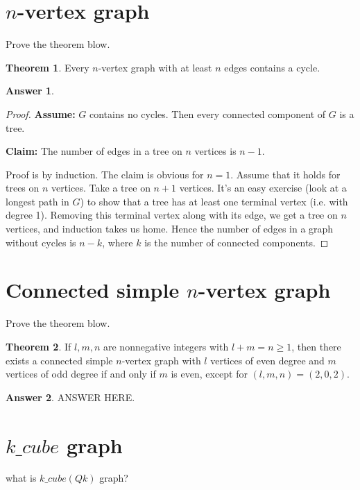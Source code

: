 \documentclass[a4paper]{article}
\renewcommand{\(}{\left(}
\renewcommand{\)}{\right)}
\theoremstyle{plain}
\theoremstyle{plain}
\theoremstyle{definition}
\newtheorem*{answer}{Answer}
\newtheorem{theorem}{Theorem}[section]
\begin{document}
\section{$n$-vertex graph}
Prove the theorem blow.
\begin{theorem}
Every $n$-vertex graph with at least $n$ edges contains a cycle.
\end{theorem}
\begin{shaded}
\begin{answer}
\begin{proof}
\textbf{Assume:} $G$ contains no cycles. Then every connected component of $G$ is a tree.

 \textbf{Claim:} The number of edges in a tree on $n$ vertices is $n-1$.

Proof is by induction. The claim is obvious for $n=1$. Assume that it holds for trees on $n$ vertices. Take a tree on $n+1$ vertices. It's an easy exercise (look at a longest path in $G$) to show that a tree has at least one terminal vertex  (i.e. with degree 1). Removing this terminal vertex along with its edge, we get a tree on $n$ vertices, and induction takes us home. Hence the number of edges in a graph without cycles is $n-k$, where $k$ is the number of connected components.
\end{proof}
\end{answer}
\end{shaded}
\section{Connected simple $n$-vertex graph}
Prove the theorem blow.
\begin{theorem}
If $l, m, n$ are nonnegative integers with $l + m = n \geq 1$, then there exists a connected simple $n$-vertex
graph with $l$ vertices of even degree and $m$ vertices of odd degree if and only if $m$ is even,
except for $(l, m, n) = (2, 0, 2)$.
\end{theorem}
\begin{shaded}
\begin{answer}
ANSWER HERE.
\end{answer}
\end{shaded}



\section{$k\_cube$ graph}
what is $k\_cube(Qk)$ graph?
\end{document}
